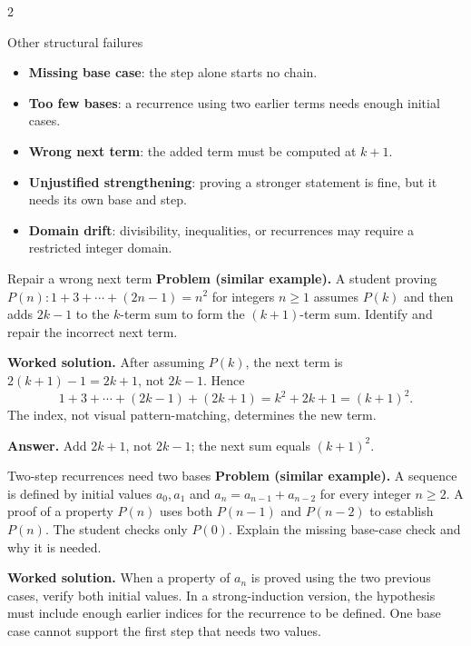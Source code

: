 \documentclass[10pt]{article}
\newcommand{\term}[1]{\textbf{\color{CoreNavy}#1}}
\begin{document}
\begin{multicols}{2}
\columnbreak

\begin{definitionbox}{Other structural failures}
\begin{itemize}
  \item \term{Missing base case}: the step alone starts no chain.
  \item \term{Too few bases}: a recurrence using two earlier terms needs enough
  initial cases.
  \item \term{Wrong next term}: the added term must be computed at $k+1$.
  \item \term{Unjustified strengthening}: proving a stronger statement is fine,
  but it needs its own base and step.
  \item \term{Domain drift}: divisibility, inequalities, or recurrences may
  require a restricted integer domain.
\end{itemize}
\end{definitionbox}

\begin{workedbox}{Repair a wrong next term}
\textbf{Problem (similar example).} A student proving
$P(n):1+3+\cdots+(2n-1)=n^2$ for integers $n\ge1$ assumes $P(k)$ and
then adds $2k-1$ to the $k$-term sum to form the $(k+1)$-term sum.
Identify and repair the incorrect next term.

\textbf{Worked solution.} After assuming $P(k)$, the next
term is $2(k+1)-1=2k+1$, not $2k-1$. Hence
\[
1+3+\cdots+(2k-1)+(2k+1)
=k^2+2k+1=(k+1)^2.
\]
The index, not visual pattern-matching, determines the new term.

\textbf{Answer.} Add $2k+1$, not $2k-1$; the next sum equals $(k+1)^2$.
\end{workedbox}

\begin{workedbox}{Two-step recurrences need two bases}
\textbf{Problem (similar example).} A sequence is defined by initial
values $a_0,a_1$ and $a_n=a_{n-1}+a_{n-2}$ for every integer $n\ge2$.
A proof of a property $P(n)$ uses both $P(n-1)$ and $P(n-2)$ to establish
$P(n)$. The student checks only $P(0)$. Explain the missing base-case check
and why it is needed.

\textbf{Worked solution.} When a property of $a_n$ is proved using the two
previous cases, verify both initial values. In a strong-induction version,
the hypothesis must include enough earlier indices for the recurrence to be
defined. One base case cannot support the first step that needs two values.


\end{workedbox}
\end{multicols}
\end{document}
